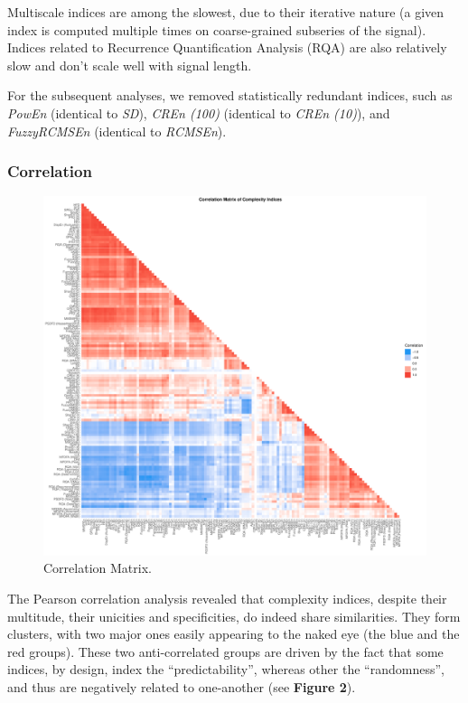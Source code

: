\documentclass[
  man]{apa6}
\begin{document}
Multiscale indices are among the slowest, due to their iterative nature (a given index is computed multiple times on coarse-grained subseries of the signal). Indices related to Recurrence Quantification Analysis (RQA) are also relatively slow and don't scale well with signal length.

For the subsequent analyses, we removed statistically redundant indices, such as \emph{PowEn} (identical to \emph{SD}), \emph{CREn (100)} (identical to \emph{CREn (10)}), and \emph{FuzzyRCMSEn} (identical to \emph{RCMSEn}).

\hypertarget{correlation}{%
\subsubsection{Correlation}\label{correlation}}

\begin{figure}
\centering
\includegraphics{manuscript_files/figure-latex/correlation-1.pdf}
\caption{\label{fig:correlation}Correlation Matrix.}
\end{figure}

The Pearson correlation analysis revealed that complexity indices, despite their multitude, their unicities and specificities, do indeed share similarities. They form clusters, with two major ones easily appearing to the naked eye (the blue and the red groups). These two anti-correlated groups are driven by the fact that some indices, by design, index the ``predictability'', whereas other the ``randomness'', and thus are negatively related to one-another (see \textbf{Figure 2}).
\end{document}
